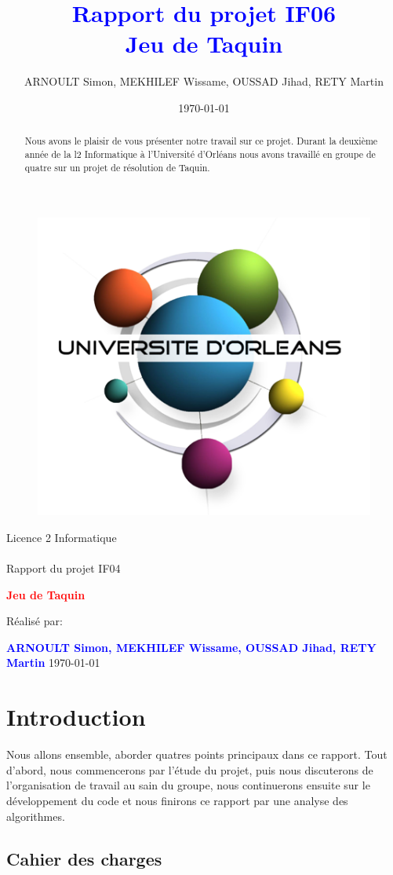 ﻿\documentclass[a4paper,twoside,12pt]{report}
\title{\textcolor{blue}{\Large Rapport du projet IF06}\\\textcolor{blue}{\Large Jeu de Taquin}}
\author{ARNOULT Simon, MEKHILEF Wissame, OUSSAD Jihad, RETY Martin \date{\today}}
\begin{document}
\thispagestyle{empty}
%
\begin{figure}[H]
\includegraphics[width=0.2\linewidth]{Logo-univ-orleans.png}

\end{figure}
\vspace{2cm}
%
\begin{center}
{\Huge Licence 2 Informatique\\\ \\Rapport du projet IF04}
\par\vspace{1.4cm}

{\Huge\bf \textcolor{red}{\bf Jeu de Taquin}}
\par\vspace{1.6cm}

{\Large       Réalisé par:}
\par\vspace{1.3cm}
{\large\bf \textcolor{blue}{ARNOULT Simon, MEKHILEF Wissame, OUSSAD Jihad, RETY Martin}}
\vfill
\today
\end{center}
\newpage
\pagestyle{fancy}

\begin{abstract}
%
Nous avons le plaisir de vous présenter notre travail sur ce projet. Durant la deuxième année de la l2 Informatique
à l'Université d'Orléans nous avons travaillé en groupe de quatre sur un projet de résolution de Taquin.
\end{abstract}
 
\newpage
\tableofcontents
\listoffigures
\newpage

\chapter{Introduction}
Nous allons ensemble, aborder quatres points principaux dans ce rapport. Tout d'abord, nous commencerons par l'étude
du projet, puis nous discuterons de l'organisation de travail au sain du groupe, nous continuerons ensuite sur le développement du code et nous
finirons ce rapport par une analyse des algorithmes.
%
\section{Cahier des charges}
\end{document}
